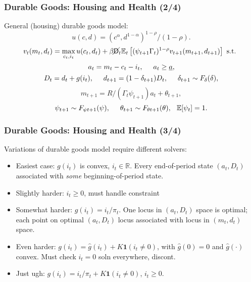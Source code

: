 \documentclass[11pt]{beamer}
\newcommand{\E}{\mathbb{E}}
\newcommand{\R}{\mathbb{R}}
\newcommand{\bi}{\begin{itemize}}
\newcommand{\ei}{\end{itemize}}
\newcommand{\Die}{\mathsf{D}}
\newcommand{\Live}{\cancel{\Die}}
\begin{document}
\begin{frame}
\frametitle{Durable Goods: Housing and Health (2/4)}

General (housing) durable goods model:
\begin{equation*}
u(c,d) = (c^\alpha,d^{1-\alpha})^{1-\rho}/(1-\rho).
\end{equation*}
\begin{equation*}
v_t(m_t,d_t) = \max_{c_t,i_t} u(c_t,d_t) + \beta \Live_t \E_t \left[(\psi_{t+1} \Gamma_t)^{1-\rho} v_{t+1}(m_{t+1},d_{t+1}) \right] \text{ s.t. }
\end{equation*}
\begin{equation*}
a_t = m_t - c_t - i_t, \hspace{0.5cm} a_t \geq \underline{a},
\end{equation*}
\begin{equation*}
D_t = d_t + g(i_t), \hspace{0.5cm} d_{t+1} = (1-\delta_{t+1})D_t, \hspace{0.5cm} \delta_{t+1} \sim F_{\delta}(\delta),
\end{equation*}
\begin{equation*}
m_{t+1} = R/(\Gamma_t \psi_{t+1}) a_t + \theta_{t+1}, 
\end{equation*}
\begin{equation*}
\psi_{t+1} \sim F_{\psi t+1}(\psi), \hspace{0.5cm} \theta_{t+1} \sim F_{\theta t+1}(\theta), \hspace{0.25cm} \E[\psi_t] = 1.
\end{equation*}
\end{frame}



\begin{frame}
\frametitle{Durable Goods: Housing and Health (3/4)}
Variations of durable goods model require different solvers:
\bi
\item <1-> Easiest case: $g(i_t)$ is convex, $i_t \in \R$.  Every end-of-period state $(a_t,D_t)$ associated with \textit{some} beginning-of-period state.

\item <1->Slightly harder: $i_t \geq 0$, must handle constraint

\item <2->Somewhat harder: $g(i_t) = i_t/\pi_t$.  One locus in $(a_t,D_t)$ space is optimal; each point on optimal $(a_t,D_t)$ locus associated with locus in $(m_t,d_t)$ space.

\item <3->Even harder: $g(i_t) = \widehat{g}(i_t) + K \mathbf{1}(i_t \neq 0)$, with $\widehat{g}(0) = 0$ and $\widehat{g}(\cdot)$ convex.  Must check $i_t=0$ soln everywhere, discont.

\item <4->Just ugh: $g(i_t) =  i_t/\pi_t +K \mathbf{1}(i_t \neq 0)$, $i_t \geq 0$.
\ei
\end{frame}
\end{document}
